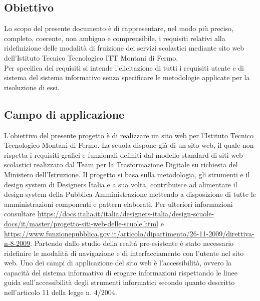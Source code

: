 \documentclass{article}
\begin{document}
	 \subsection{\textbf{Obiettivo}} 
	\flushleft
	\normalsize
	Lo scopo del presente documento è di rappresentare, nel modo più preciso, completo, coerente, non  ambiguo e comprensibile, i requisiti relativi alla ridefinizione delle modalità di fruizione dei servizi scolastici mediante sito web dell'Istituto Tecnico Tecnologico ITT Montani di Fermo.\\ 
	Per specifica dei requisiti si intende l’elicitazione di tutti i requisiti utente e di sistema del sistema informativo senza specificare le metodologie applicate per la risoluzione di essi.
	
	\subsection{\textbf{Campo di applicazione}}
	L'obiettivo del presente progetto è di realizzare un sito web per l'Istituto Tecnico Tecnologico Montani di Fermo. La scuola dispone già di un sito web, il quale non rispetta i requisiti grafici e funzionali definiti dal modello standard di siti web scolastici realizzato dal Team per la Trasformazione Digitale su richiesta del Ministero dell'Istruzione. Il progetto si basa sulla metodologia, gli strumenti e il design system di Designers Italia e a sua volta, contribuisce ad alimentare il design system della Pubblica Amministrazione mettendo a disposizione di tutte le amministrazioni componenti e pattern elaborati. Per ulteriori informazioni consultare \url{https://docs.italia.it/italia/designers-italia/design-scuole-docs/it/master/progetto-siti-web-delle-scuole.html} e \url{https://www.funzionepubblica.gov.it/articolo/dipartimento/26-11-2009/direttiva-n-8-2009}. Partendo dallo studio della realtà pre-esistente è stato necessario ridefinire le modalità di navigazione e di interfacciamento con l'utente nel sito web. 
	Uno dei campi di applicazione del sito web è l'accessibilità, ovvero la capacità del sistema informativo di erogare informazioni rispettando le linee guida sull’accessibilità degli strumenti informatici secondo quanto descritto nell’articolo 11 della legge n. 4/2004.
	
	
\end{document}
